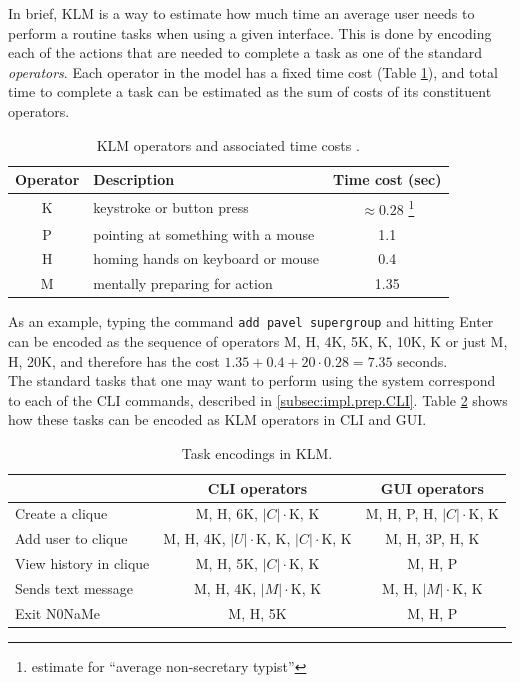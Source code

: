 \documentclass[a4paper, twoside, 12pt]{report}
\newcommand{\funkytt}{\fontfamily{AnonymousPro}\selectfont}
\begin{document}
In brief, KLM is a way to estimate how much time an average user needs to perform a routine tasks when using a given interface. This is done by encoding each of the actions that are needed to complete a task as one of the standard \emph{operators}. Each operator in the model has a fixed time cost (Table \ref{tab:KLM}), and total time to complete a task can be estimated as the sum of costs of its constituent operators.

\begin{table}[H]
\centering
\begin{tabular*}{0.79\linewidth}{c | l | c}
Operator & Description & Time cost (sec) \\
\hline
K & keystroke or button press & $\approx 0.28$ \footnote{estimate for ``average non-secretary typist''} \\
P & pointing at something with a mouse & 1.1 \\
H & homing hands on keyboard or mouse & 0.4 \\
M & mentally preparing for action & 1.35 \\
\end{tabular*}
\caption{\label{tab:KLM} KLM operators and associated time costs \cite{card1980keystroke}\cite{sauro2009estimating}.}
\end{table}

As an example, typing the command \texttt{add pavel supergroup} and hitting Enter can be encoded as the sequence of operators M, H, 4K, 5K, K, 10K, K or just M, H, 20K, and therefore has the cost $1.35 + 0.4 + 20 \cdot 0.28 = 7.35$ seconds. \\


The standard tasks that one may want to perform using the system correspond to each of the CLI commands, described in \cref{subsec:impl.prep.CLI}. Table \ref{tab:KLM_encode} shows how these tasks can be encoded as KLM operators in CLI and GUI.

\begin{table}[H]
\centering
\begin{tabular*}{1.0\linewidth}{l | c | c}
        & CLI operators & GUI operators \\
\hline
Create a clique & M, H, 6K,  $|C|\cdot$K, K & M, H, P, H,  $|C|\cdot$K, K\\
Add user to clique & M, H, 4K, $|U|\cdot$K, K, $|C|\cdot$K, K & M, H, 3P, H, K \\
View history in clique & M, H, 5K, $|C|\cdot$K, K & M, H, P \\
Sends text message & M, H, 4K, $|M|\cdot$K, K & M, H, $|M|\cdot$K, K \\
Exit {\funkytt N0NaMe} & M, H, 5K & M, H, P \\
\end{tabular*}
\caption{\label{tab:KLM_encode} Task encodings in KLM.}
\end{table}
\end{document}
